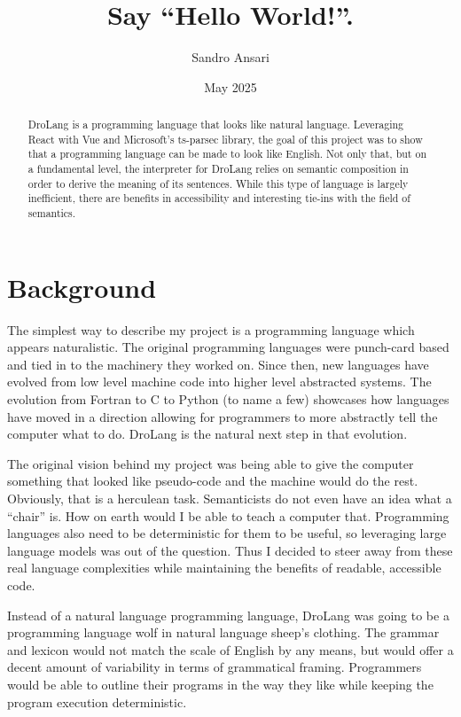 \documentclass[titlepage]{article}
\title{Say ``Hello World!''.}
\author{Sandro Ansari}
\date{May 2025}
\newcommand{\langName}{DroLang}
\begin{document}
\maketitle

\begin{abstract}
	\langName{} is a programming language that looks like natural language. Leveraging React with Vue and Microsoft's ts-parsec library, the goal of this project was to show that a programming language can be made to look like English. Not only that, but on a fundamental level, the interpreter for \langName{} relies on semantic composition in order to derive the meaning of its sentences. While this type of language is largely inefficient, there are benefits in accessibility and interesting tie-ins with the field of semantics.
\end{abstract}

\section*{Background}
The simplest way to describe my project is a programming language which appears naturalistic. The original programming languages were punch-card based and tied in to the machinery they worked on. Since then, new languages have evolved from low level machine code into higher level abstracted systems. The evolution from Fortran to C to Python (to name a few) showcases how languages have moved in a direction allowing for programmers to more abstractly tell the computer what to do. \langName{} is the natural next step in that evolution.

The original vision behind my project was being able to give the computer something that looked like pseudo-code and the machine would do the rest. Obviously, that is a herculean task. Semanticists do not even have an idea what a “chair” is. How on earth would I be able to teach a computer that. Programming languages also need to be deterministic for them to be useful, so leveraging large language models was out of the question. Thus I decided to steer away from these real language complexities while maintaining the benefits of readable, accessible code.

Instead of a natural language programming language, \langName{} was going to be a programming language wolf in natural language sheep's clothing. The grammar and lexicon would not match the scale of English by any means, but would offer a decent amount of variability in terms of grammatical framing. Programmers would be able to outline their programs in the way they like while keeping the program execution deterministic.
\end{document}
